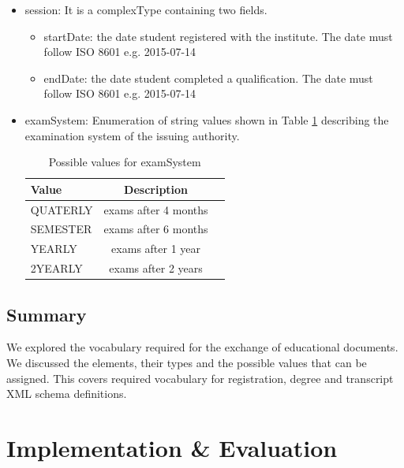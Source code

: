 \documentclass[12pt,a4paper,oneside]{book}
\begin{document}
\begin{itemize}
\item session: It is a complexType containing two fields.

	 \begin{itemize}
	 	\item startDate: the date student registered with the institute. The date must follow ISO 8601 e.g. 2015-07-14
	 	\item endDate: the date student completed a qualification. The date must follow ISO 8601 e.g. 2015-07-14
	 \end{itemize}

\item examSystem: Enumeration of string values shown in Table \ref{tab:examSystem} describing the examination system of the issuing authority.

\begin{table}[!tbh]
\caption{Possible values for examSystem}
\label{tab:examSystem}
\centering
\begin{tabular}[width=\columnwidth]{|p{1.3in}|c|c|}
\hline
Value       		& Description \\
\hline
QUATERLY 	    & exams after 4 months \\
SEMESTER	    & exams after 6 months \\
YEARLY			& exams after 1 year \\
2YEARLY	    	& exams after 2 years \\
\hline
\end{tabular}
\end{table}



\end{itemize}

\section{Summary}
We explored the vocabulary required for the exchange of educational documents. We discussed the elements, their types and the possible values that can be assigned. This covers required vocabulary for registration, degree and transcript XML schema definitions. 

\chapter{Implementation \& Evaluation}\label{ch-implement}
\end{document}
